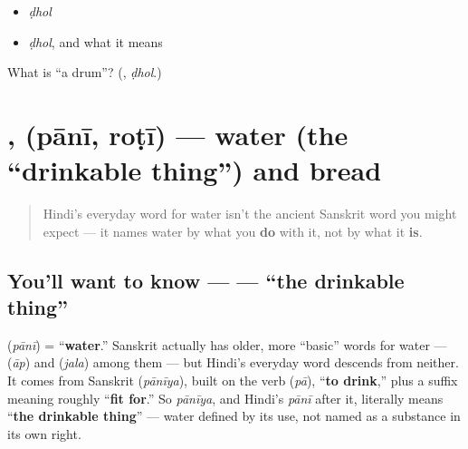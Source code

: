 \begin{itemize}
\raggedright
  \item \emph{ḍhol}
  \item \emph{ḍhol}, and what it means
\end{itemize}

\begin{tcolorbox}[breakable,colback=teal!4,colframe=teal!35!black,title={Before you move on}]
What is \textquotedblleft{}a drum\textquotedblright{}? (\textbf{}, \emph{ḍhol}.)
\end{tcolorbox}
\section[\texorpdfstring{\hi{पानी} \hi{रोटी} (pānī roṭī)}{पानी रोटी (pānī roṭī)}]{,  (pānī, roṭī) — water (the \textquotedblleft{}drinkable thing\textquotedblright{}) and bread}

\label{lesson:HI-C15-paani-roti}



\begin{quote}
Hindi's everyday word for water isn't the ancient Sanskrit word you might expect — it names water by what you \textbf{do} with it, not by what it \textbf{is}.
\end{quote}

\subsection*{You'll want to know —  — \textquotedblleft{}the drinkable thing\textquotedblright{}}
\textbf{} (\emph{pānī}) = \textquotedblleft{}\textbf{water}.\textquotedblright{} Sanskrit actually has older, more \textquotedblleft{}basic\textquotedblright{} words for water — \textbf{} (\emph{āp}) and \textbf{} (\emph{jala}) among them — but Hindi's everyday word descends from neither. It comes from Sanskrit \textbf{} (\emph{pānīya}), built on the verb \textbf{} (\emph{pā}), \textquotedblleft{}\textbf{to drink},\textquotedblright{} plus a suffix meaning roughly \textquotedblleft{}\textbf{fit for}.\textquotedblright{} So \emph{pānīya}, and Hindi's \emph{pānī} after it, literally means \textquotedblleft{}\textbf{the drinkable thing}\textquotedblright{} — water defined by its use, not named as a substance in its own right.

